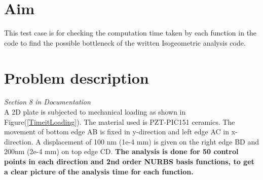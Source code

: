 \documentclass[11pt]{article}
\begin{document}
\section{Aim}
This test case is for checking the computation time taken by each function in the code to find the possible bottleneck of the written Isogeometric analysis code.
\section{Problem description} \label{2DPWLELPD}
\emph{Section 8 in Documentation}\\
A 2D plate is subjected to mechanical loading as shown in Figure(\ref{TimeitLoading}). The material used is PZT-PIC151 ceramics.
The movement of bottom edge AB is fixed in y-direction and left edge AC in x-direction. A displacement of 100 nm (1e-4 mm) is given on the right edge BD and 200nm (2e-4 mm) on top edge CD.
\textbf{The analysis is done for 50 control points in each direction and 2nd order NURBS basis functions, to get a clear picture of the analysis time for each function.}
\end{document}
